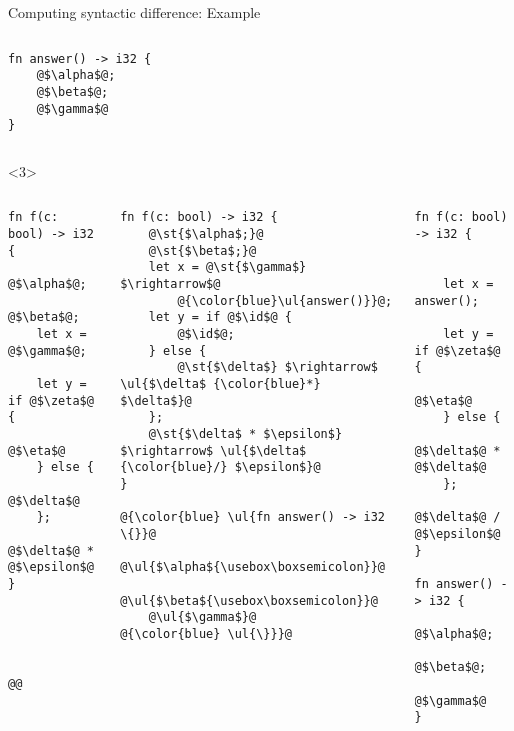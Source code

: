 \documentclass{beamer}
\makeatletter
\let\UL\ul
\renewcommand\ul{%
  \let\set@color\beamerorig@set@color
  \let\reset@color\beamerorig@reset@color
  \UL}
\let\ST\st
\renewcommand\st{%
  \let\set@color\beamerorig@set@color
  \let\reset@color\beamerorig@reset@color
  \ST}
\newcommand\id{\square}
\makeatother
\begin{document}
\begin{frame}[fragile]{Computing syntactic difference: Example}
\begin{onlyenv}
\begin{columns}
\begin{column}{0.45\textwidth}
\begin{lstlisting}[rulecolor=\color{blue!40}]
fn answer() -> i32 {
    @$\alpha$@;
    @$\beta$@;
    @$\gamma$@
}
\end{lstlisting}
\end{column}
\end{columns}
\end{onlyenv}

\begin{onlyenv}<3>
\begin{columns}
\begin{column}{0.33\textwidth}
\vspace{0.5em}
\begin{lstlisting}
fn f(c: bool) -> i32 {
    @$\alpha$@;
    @$\beta$@;
    let x = @$\gamma$@;

    let y = if @$\zeta$@ {
        @$\eta$@
    } else {
        @$\delta$@
    };
    @$\delta$@ * @$\epsilon$@
}





@@
\end{lstlisting}
\end{column}
\begin{column}{0.33\textwidth}
\vspace{0.5em}
\begin{lstlisting}[rulecolor=\color{blue!20}]
fn f(c: bool) -> i32 {
    @\st{$\alpha$;}@
    @\st{$\beta$;}@
    let x = @\st{$\gamma$} $\rightarrow$@
        @{\color{blue}\ul{answer()}}@;
    let y = if @$\id$@ {
        @$\id$@;
    } else {
        @\st{$\delta$} $\rightarrow$ \ul{$\delta$ {\color{blue}*} $\delta$}@
    };
    @\st{$\delta$ * $\epsilon$} $\rightarrow$ \ul{$\delta$ {\color{blue}/} $\epsilon$}@
}

@{\color{blue} \ul{fn answer() -> i32 \{}}@
    @\ul{$\alpha${\usebox\boxsemicolon}}@
    @\ul{$\beta${\usebox\boxsemicolon}}@
    @\ul{$\gamma$}@
@{\color{blue} \ul{\}}}@
\end{lstlisting}
\end{column}
\begin{column}{0.33\textwidth}
\vspace{0.5em}
\begin{lstlisting}[rulecolor=\color{blue!40}]
fn f(c: bool) -> i32 {


    let x = answer();
    
    let y = if @$\zeta$@ {
        @$\eta$@
    } else {
        @$\delta$@ * @$\delta$@
    };
    @$\delta$@ / @$\epsilon$@
}

fn answer() -> i32 {
    @$\alpha$@;
    @$\beta$@;
    @$\gamma$@
}
\end{lstlisting}
\end{column}
\end{columns}
\end{onlyenv}
\end{frame}
\end{document}
